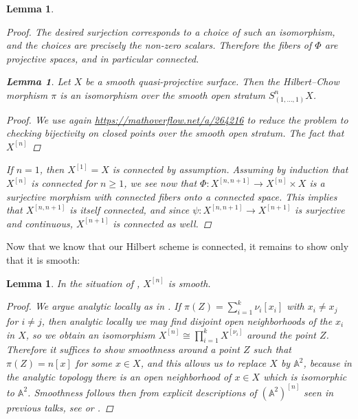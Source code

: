 \documentclass[12pt,a4paper]{amsart}
\theoremstyle{plain}
\newtheorem{lm}[thm]{Lemma}
\theoremstyle{definition}
\theoremstyle{remark}
\begin{document}
\begin{lm}
\begin{proof}
    The desired surjection corresponds to a choice of such an isomorphism, and the choices are precisely the non-zero scalars.
    Therefore the fibers of $\Phi$ are projective spaces, and in particular connected.
\begin{lm}\label{lm:overstratum}
  Let $X$ be a smooth quasi-projective surface.
  Then the Hilbert--Chow morphism $\pi$ is an isomorphism over the smooth open stratum $S^{n}_{(1,\ldots,1)}X$.
  \begin{proof}
    We use again \url{https://mathoverflow.net/a/264216} to reduce the problem to checking bijectivity on closed points over the smooth open stratum.
    The fact that $X^{[n]}$
  \end{proof}
\end{lm}


    If $n = 1$, then $X^{[1]} = X$ is connected by assumption.
    Assuming by induction that $X^{[n]}$ is connected for $n \geq 1$, we see now that $\Phi \colon X^{[n, n+1]} \to X^{[n]} \times X$ is a surjective morphism with connected fibers onto a connected space.
    This implies that $X^{[n, n+1]}$ is itself connected, and since $\psi \colon X^{[n,n+1]} \to X^{[n+1]}$ is surjective and continuous, $X^{[n+1]}$ is connected as well.
  \end{proof}
\end{lm}

Now that we know that our Hilbert scheme is connected, it remains to show only that it is smooth:

\begin{lm}\label{lm:smoothness}
  In the situation of , $X^{[n]}$ is smooth.

  \begin{proof}
    We argue analytic locally as in .
    If $\pi(Z) = \sum_{i = 1}^{k} \nu_{i} [x_{i}]$ with $x_{i} \neq x_{j}$ for $i \neq j$, then analytic locally we may find disjoint open neighborhoods of the $x_{i}$ in $X$, so we obtain an isomorphism $X^{[n]} \cong \prod_{i = 1}^{k} X^{[\nu_{i}]}$ around the point $Z$.
    Therefore it suffices to show smoothness around a point $Z$ such that $\pi(Z) = n [x]$ for some $x \in X$, and this allows us to replace $X$ by $\mathbb{A}^{2}$, because in the analytic topology there is an open neighborhood of $x \in X$ which is isomorphic to $\mathbb{A}^{2}$.
    Smoothness follows then from explicit descriptions of $(\mathbb{A}^{2})^{[n]}$ seen in previous talks, see \cite[Theorem 1.9]{nak99} or \cite[Theorem 18.7]{ms05}.
  \end{proof}
\end{lm}
\end{document}
